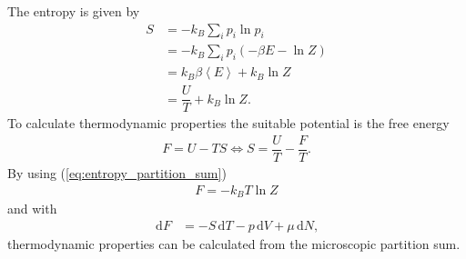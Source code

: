 \documentclass[a4paper,10pt]{article}
\newcommand{\td}{\,\text{d}}
\numberwithin{equation}{section}
\begin{document}
\begin{multicols}{2}
The entropy is given by
\begin{align} 
  S &= -k_B\sum_{i}^{}p_i\ln p_i\\
    &= -k_B\sum_{i}^{}p_i\left(-\beta E-\ln Z\right)\\
    &= k_B\beta \left\langle E\right\rangle +k_B\ln Z\\
    &= \dfrac{U}{T}+k_B\ln Z \label{eq:entropy_partition_sum}
.\end{align} 
To calculate thermodynamic properties the suitable potential is the free energy 
\begin{align} 
  F=U-TS \Leftrightarrow S=\dfrac{U}{T}-\dfrac{F}{T}
.\end{align} 
By using (\ref{eq:entropy_partition_sum})
\begin{align} 
  \boxed{F=-k_BT\ln Z}
\end{align} 
and with
\begin{align} 
  \td F &= -S\td T-p\td V+\mu \td N
,\end{align} 
thermodynamic properties can be calculated from the microscopic partition sum.


\end{multicols}
\end{document}
